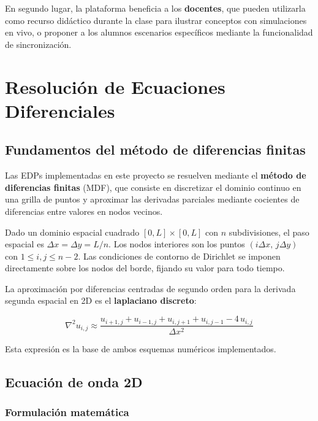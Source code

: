 \documentclass[12pt, a4paper]{article}
\begin{document}
En segundo lugar, la plataforma beneficia a los \textbf{docentes}, que pueden utilizarla
como recurso didáctico durante la clase para ilustrar conceptos con simulaciones en
vivo, o proponer a los alumnos escenarios específicos mediante la funcionalidad de
sincronización.

\newpage

\section{Resolución de Ecuaciones Diferenciales}

\subsection{Fundamentos del método de diferencias finitas}

Las EDPs implementadas en este proyecto se resuelven mediante el \textbf{método de
diferencias finitas} (MDF), que consiste en discretizar el dominio continuo en una
grilla de puntos y aproximar las derivadas parciales mediante cocientes de diferencias
entre valores en nodos vecinos.

Dado un dominio espacial cuadrado $[0,L]\times[0,L]$ con $n$ subdivisiones, el paso
espacial es $\Delta x = \Delta y = L/n$. Los nodos interiores son los puntos
$(i\Delta x,\, j\Delta y)$ con $1 \leq i,j \leq n-2$. Las condiciones de contorno de
Dirichlet se imponen directamente sobre los nodos del borde, fijando su valor para
todo tiempo.

La aproximación por diferencias centradas de segundo orden para la derivada segunda
espacial en 2D es el \textbf{laplaciano discreto}:

\begin{equation}
    \nabla^2 u_{i,j} \approx
    \frac{u_{i+1,j} + u_{i-1,j} + u_{i,j+1} + u_{i,j-1} - 4\,u_{i,j}}{\Delta x^2}
    \label{eq:laplaciano}
\end{equation}

Esta expresión es la base de ambos esquemas numéricos implementados.

\subsection{Ecuación de onda 2D}

\subsubsection{Formulación matemática}
\end{document}
